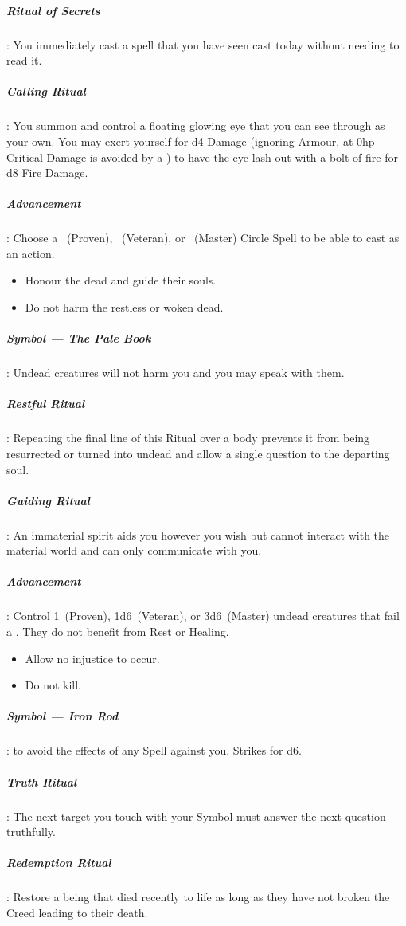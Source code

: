 \documentclass[itdr]{subfiles}
\begin{document}
\subparagraph{Ritual of Secrets}: You immediately cast a spell that you have seen cast today without needing to read it.

\subparagraph{Calling Ritual}: You summon and control a floating glowing eye that you can see through as your own. You may exert yourself for d4 Damage (ignoring Armour, at 0hp Critical Damage is avoided by a ) to have the eye lash out with a bolt of fire for d8 Fire Damage.

\subparagraph{Advancement}: Choose a ~(Proven), ~(Veteran), or ~(Master) Circle Spell to be able to cast as an action.

\vspace{1em}

{\em\begin{itemize}
		\item Honour the dead and guide their souls.
		\item Do not harm the restless or woken dead.
\end{itemize}}

\subparagraph{Symbol --- The Pale Book}: Undead creatures will not harm you and you may speak with them.

\subparagraph{Restful Ritual}: Repeating the final line of this Ritual over a body prevents it from being resurrected or turned into undead and allow a single question to the departing soul.

\subparagraph{Guiding Ritual}: An immaterial spirit aids you however you wish but cannot interact with the material world and can only communicate with you.

\subparagraph{Advancement}: Control 1~(Proven), 1d6~(Veteran), or 3d6~(Master) undead creatures that fail a . They do not benefit from Rest or Healing.

\vfill
\break

{\em\begin{itemize}
		\item Allow no injustice to occur.
		\item Do not kill.
\end{itemize}}

\subparagraph{Symbol --- Iron Rod}:  to avoid the effects of any Spell against you. Strikes for d6.

\subparagraph{Truth Ritual}: The next target you touch with your Symbol must answer the next question truthfully.

\subparagraph{Redemption Ritual}: Restore a being that died recently to life as long as they have not broken the Creed leading to their death.
\end{document}
